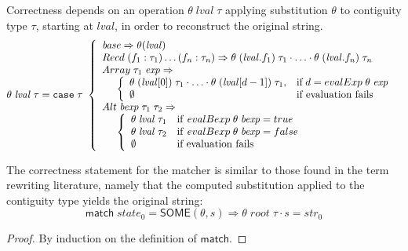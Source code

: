 \documentclass[a4paper,UKenglish,cleveref, autoref, thm-restate]{lipics-v2021}
\newcommand{\konst}[1]{\ensuremath{\mathsf{#1}}}
\newcommand{\imp}{\Rightarrow}
\newcommand{\SubstTheta}[2]{\ensuremath{\theta\;{#1}\; {#2}}}
\begin{document}
\begin{definition}

Correctness depends on an operation $\SubstTheta{\mathit{lval}}{\tau}$
applying substitution $\theta$ to contiguity type $\tau$, starting
at $\mathit{lval}$, in order to reconstruct the original string.
%
\[
\SubstTheta{\mathit{lval}}{\tau} =
\mathtt{case}\; \tau\
 \left\{
 \begin{array}{l}
 \mathit{base} \Rightarrow \theta(\mathit{lval})
\\
 \konst{Recd}\; (f_1 : \tau_1) \ldots (f_n : \tau_n) \Rightarrow
   \SubstTheta{(\mathit{lval}.f_1)}{\tau_1} \cdot \ldots \cdot \SubstTheta{(\mathit{lval}.f_n)}{\tau_n}
\\
 \konst{Array}\; \tau_1 \; \mathit{exp} \Rightarrow \\
  \hspace*{5mm}
 \left\{
 \begin{array}{ll}
  \SubstTheta{(\mathit{lval}[0])}{\tau_1} \cdot \ldots \cdot
  \SubstTheta{(\mathit{lval}[d-1])}{\tau_1}, &
   \text{if}\; d = \konst{evalExp}\;\theta\;\mathit{exp} \\
    \emptyset & \text{if evaluation fails}
 \end{array}
 \right.
 \\
 \konst{Alt}\; \mathit{bexp}\;\tau_1\; \tau_2 \Rightarrow \\
  \hspace*{5mm}
 \left\{
 \begin{array}{ll}
    \SubstTheta{\mathit{lval}}{\tau_1} & \mathrm{if}\ \konst{evalBexp}\;\theta\;\mathit{bexp} = \konst{true} \\
    \SubstTheta{\mathit{lval}}{\tau_2} & \mathrm{if}\ \konst{evalBexp}\;\theta\;\mathit{bexp} = \konst{false} \\
    \emptyset          & \text{if evaluation fails}
 \end{array}
 \right.
 \\
\end{array}
 \right.
\]

\end{definition}

\begin{theorem}
The correctness statement for the matcher is similar to those found in
the term rewriting literature, namely that the computed substitution
applied to the contiguity type yields the original string:
%
\[
  \konst{match}\;\mathit{state}_0 = \konst{SOME}(\theta, s)
  \imp \theta\;\mathit{root}\;\tau \cdot s = \mathit{str}_0
\]
%
\begin{proof}
By induction on the definition of \konst{match}.
\end{proof}
\end{theorem}
\end{document}
